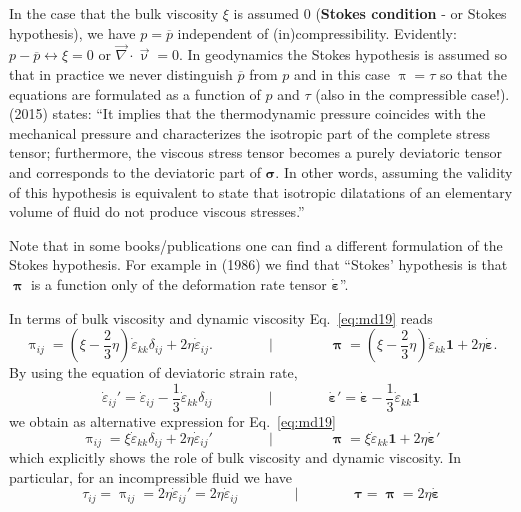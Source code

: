\begin{remark}
In the case that the bulk viscosity $\xi$ is assumed 0 ({\bf Stokes condition} - or Stokes hypothesis), 
we have $p = \overline{p}$ 
independent of (in)compressibility. Evidently: $p - \overline{p} \leftrightarrow \xi=0$
or $\vec\nabla \cdot \vec\upnu= 0$.
In geodynamics the Stokes hypothesis is assumed so that in practice we never 
distinguish $\overline{p}$ from $p$
and in this case $\uppi=\tau$ so that the equations are formulated as a function 
of $p$ and $\tau$ (also in the 
compressible case!).
\textcite{bure15} (2015) states: ``It implies that the thermodynamic pressure
coincides with the mechanical pressure and characterizes the isotropic part of 
the complete stress tensor; furthermore, the viscous stress tensor becomes a purely 
deviatoric tensor and corresponds to the deviatoric part of ${\bm \sigma}$. 
In other words, assuming the validity of this hypothesis is equivalent to state that isotropic dilatations
of an elementary volume of fluid do not produce viscous stresses.''

Note that in some books/publications one can find a different formulation of the Stokes hypothesis.
For example in \textcite{caod86} (1986) we find that ``Stokes' hypothesis is that ${\bm\uppi}$ is a function
only of the deformation rate tensor $\dot{\bm\varepsilon}$''.
\end{remark}

In terms of bulk viscosity and dynamic viscosity Eq.~\eqref{eq:md19} reads
\begin{equation}
\uppi_{ij} = \left(\xi-\frac23 \eta \right) \dot\varepsilon_{kk} \delta_{ij} + 2\eta \dot\varepsilon_{ij}.
\qquad
\qquad
\bigg\rvert
\qquad
\qquad
{\bm \uppi} = \left(\xi-\frac23 \eta \right) \dot\varepsilon_{kk} {\bm 1} + 2\eta \dot{\bm \varepsilon}.
\label{eq:piij}
\end{equation}
By using the equation of deviatoric strain rate,
\begin{equation}
\dot\varepsilon_{ij}' = \dot\varepsilon_{ij} -\frac13  \dot\varepsilon_{kk} \delta_{ij}
\qquad
\qquad
\bigg\rvert
\qquad
\qquad
\dot{\bm \varepsilon}' = \dot{\bm \varepsilon} - \frac13 \dot\varepsilon_{kk} {\bm 1}
\end{equation}
we obtain as alternative expression for Eq.~\eqref{eq:md19}
\begin{equation}
\uppi_{ij} = \xi  \dot\varepsilon_{kk} \delta_{ij} + 2 \eta \dot\varepsilon_{ij}'
\qquad
\qquad
\bigg\rvert
\qquad
\qquad
{\bm \uppi} = \xi \dot\varepsilon_{kk} {\bm 1} + 2 \eta \dot{\bm \varepsilon}'
\label{eq:md21}
\end{equation}
which explicitly shows the role of bulk viscosity and dynamic viscosity. In particular, for
an incompressible fluid we have
\begin{equation}
\tau_{ij}=\uppi_{ij}=2\eta \dot\varepsilon_{ij}' = 2 \eta \dot\varepsilon_{ij}
\qquad
\qquad
\bigg\rvert
\qquad
\qquad
{\bm \tau} = {\bm \uppi} = 2 \eta \dot{\bm \varepsilon}
\label{eq:md22}
\end{equation}

